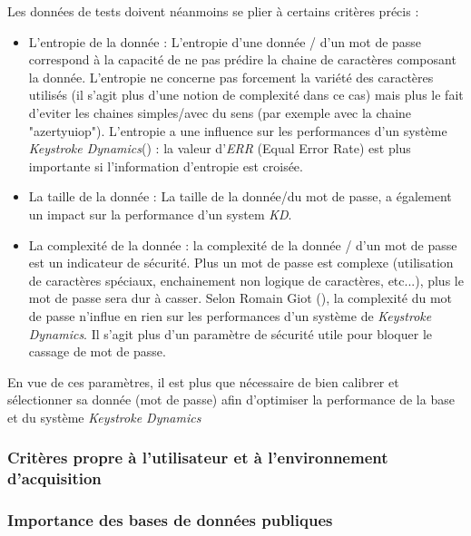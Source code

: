 Les données de tests doivent néanmoins se plier à certains critères précis :\\

\begin{itemize}
\item L'entropie de la donnée : L'entropie d'une donnée / d'un mot de passe correspond à la capacité de ne pas prédire la chaine de caractères composant la donnée. L'entropie ne concerne pas forcement la variété des caractères utilisés (il s'agit plus d'une notion de complexité dans ce cas) mais plus le fait d'eviter les chaines simples/avec du sens (par exemple avec la chaine "azertyuiop"). L'entropie a une influence sur les performances d'un système \textit{Keystroke Dynamics}(\cite{giotWeb}) : la valeur d'\textit{ERR} (Equal Error Rate) est plus importante si l'information d'entropie est croisée.\\

\item La taille de la donnée : La taille de la donnée/du mot de passe, a également un impact sur la performance d'un system \textit{KD}.\\

\item La complexité de la donnée : la complexité de la donnée / d'un mot de passe est un indicateur de sécurité. Plus un mot de passe est complexe (utilisation de caractères spéciaux, enchainement non logique de caractères, etc...), plus le mot de passe sera dur à casser. Selon Romain Giot (\cite{giotWeb}), la complexité du mot de passe n'influe en rien sur les performances d'un système de \textit{Keystroke Dynamics}. Il s'agit plus d'un paramètre de sécurité utile pour bloquer le cassage de mot de passe.\\

\end{itemize}

En vue de ces paramètres, il est plus que nécessaire de bien calibrer et sélectionner sa donnée (mot de passe) afin d'optimiser la performance de la base et du système \textit{Keystroke Dynamics}\\

\subsubsection{Critères propre à l'utilisateur et à l'environnement d'acquisition}


\subsubsection{Importance des bases de données publiques}

